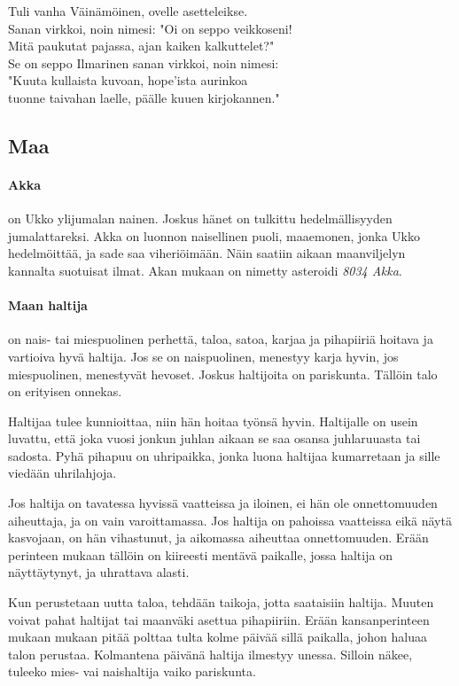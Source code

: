   \begin{center}\begin{em}
    Tuli vanha Väinämöinen, ovelle asetteleikse.\\
    Sanan virkkoi, noin nimesi: "Oi on seppo veikkoseni!\\
    Mitä paukutat pajassa, ajan kaiken kalkuttelet?"\\
    Se on seppo Ilmarinen sanan virkkoi, noin nimesi:\\
    "Kuuta kullaista kuvoan, hope'ista aurinkoa\\
    tuonne taivahan laelle, päälle kuuen kirjokannen."\\
  \end{em}\end{center}


\subsection{Maa}

  \paragraph{Akka} on Ukko ylijumalan nainen. Joskus hänet on tulkittu hedelmällisyyden
    jumalattareksi. Akka on luonnon naisellinen puoli, maaemonen, jonka Ukko hedelmöittää,
    ja sade saa viheriöimään. Näin saatiin aikaan maanviljelyn kannalta suotuisat ilmat.
    Akan mukaan on nimetty asteroidi \emph{8034 Akka}.
  \paragraph{Maan haltija} on nais- tai miespuolinen perhettä, taloa, satoa, karjaa ja pihapiiriä
    hoitava ja vartioiva hyvä haltija. Jos se on naispuolinen, menestyy karja hyvin, jos
    miespuolinen, menestyvät hevoset. Joskus haltijoita on pariskunta. Tällöin talo on erityisen
    onnekas.
    \par
    Haltijaa tulee kunnioittaa, niin hän hoitaa työnsä hyvin. Haltijalle on usein luvattu, että
    joka vuosi jonkun juhlan aikaan se saa osansa juhlaruuasta tai sadosta. Pyhä pihapuu on
    uhripaikka, jonka luona haltijaa kumarretaan ja sille viedään uhrilahjoja.
    \par
    Jos haltija on tavatessa hyvissä vaatteissa ja iloinen, ei hän ole onnettomuuden aiheuttaja,
    ja on vain varoittamassa. Jos haltija on pahoissa vaatteissa eikä näytä kasvojaan, on hän
    vihastunut, ja aikomassa aiheuttaa onnettomuuden. Erään perinteen mukaan tällöin on kiireesti
    mentävä paikalle, jossa haltija on näyttäytynyt, ja uhrattava alasti.
    \par
    Kun perustetaan uutta taloa, tehdään taikoja, jotta saataisiin haltija. Muuten voivat pahat
    haltijat tai maanväki asettua pihapiiriin. Erään kansanperinteen mukaan mukaan pitää polttaa
    tulta kolme päivää sillä paikalla, johon haluaa talon perustaa. Kolmantena päivänä haltija
    ilmestyy unessa. Silloin näkee, tuleeko mies- vai naishaltija vaiko pariskunta.
